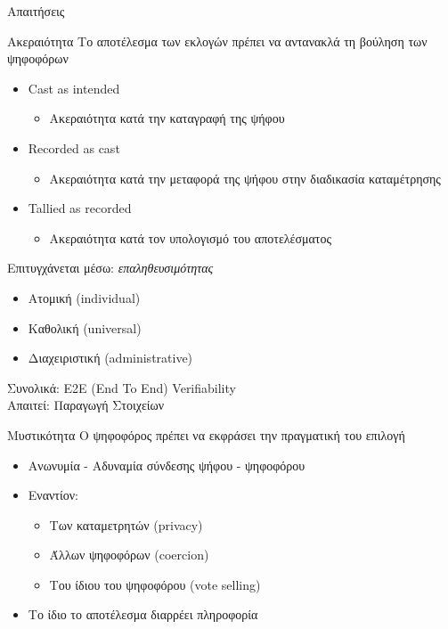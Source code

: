 \documentclass[handout]{beamer}
\begin{document}
\begin{section}{Απαιτήσεις}

\begin{frame}{Ακεραιότητα}
Το αποτέλεσμα των εκλογών πρέπει να αντανακλά τη βούληση των ψηφοφόρων \pause
\begin{itemize}
     \item Cast as intended \pause 
     \begin{itemize}
         \item Ακεραιότητα κατά την καταγραφή της ψήφου
     \end{itemize}
     \item Recorded as cast \pause
     \begin{itemize}
         \item Ακεραιότητα κατά την μεταφορά της ψήφου στην διαδικασία καταμέτρησης
     \end{itemize}
     \item Tallied as recorded \pause
     \begin{itemize}
         \item Ακεραιότητα κατά τον υπολογισμό του αποτελέσματος
     \end{itemize}
\end{itemize} \pause
Επιτυγχάνεται μέσω: \textit{επαληθευσιμότητας}
\begin{itemize} \pause
    \item Ατομική (individual)
    \item Καθολική (universal)
    \item Διαχειριστική (administrative)
\end{itemize} \pause
Συνολικά: E2E (End To End) Verifiability \\
Απαιτεί: Παραγωγή Στοιχείων
\end{frame}

\begin{frame}{Μυστικότητα}
O ψηφοφόρος πρέπει να εκφράσει την πραγματική του επιλογή \pause
\begin{itemize} 
\item Ανωνυμία - Αδυναμία σύνδεσης ψήφου - ψηφοφόρου
\item Εναντίον: \pause
\begin{itemize}
    \item Των καταμετρητών (privacy)
    \item Άλλων ψηφοφόρων (coercion)
    \item Του ίδιου του ψηφοφόρου (vote selling)
\end{itemize} \pause
\item Το ίδιο το αποτέλεσμα διαρρέει πληροφορία
\end{itemize}
\end{frame}


\end{section}
\end{document}
